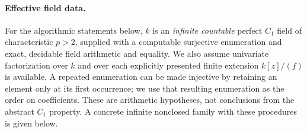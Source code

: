 \paragraph{Effective field data.}
For the algorithmic statements below, $k$ is an \emph{infinite countable}
perfect $C_1$ field of characteristic $p>2$, supplied with a computable
surjective enumeration and exact, decidable field arithmetic and equality.
We also assume univariate factorization over $k$ and over each explicitly
presented finite extension $k[z]/(f)$ is available. A repeated enumeration
can be made injective by retaining an element only at its first occurrence;
we use that resulting enumeration as the order on coefficients. These
are arithmetic hypotheses, not conclusions from the abstract $C_1$
property. A concrete infinite nonclosed family with these procedures
is given below.

